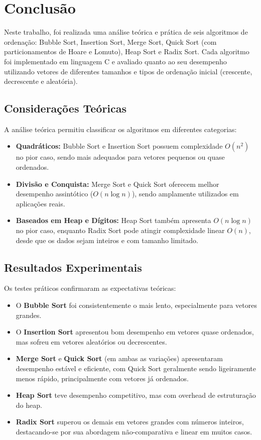 \section{Conclusão}

Neste trabalho, foi realizada uma análise teórica e prática de seis algoritmos de ordenação: Bubble Sort, Insertion Sort, Merge Sort, Quick Sort (com particionamentos de Hoare e Lomuto), Heap Sort e Radix Sort. Cada algoritmo foi implementado em linguagem C e avaliado quanto ao seu desempenho utilizando vetores de diferentes tamanhos e tipos de ordenação inicial (crescente, decrescente e aleatória).

\subsection*{Considerações Teóricas}

A análise teórica permitiu classificar os algoritmos em diferentes categorias:

\begin{itemize}
    \item \textbf{Quadráticos:} Bubble Sort e Insertion Sort possuem complexidade \(O(n^2)\) no pior caso, sendo mais adequados para vetores pequenos ou quase ordenados.
    \item \textbf{Divisão e Conquista:} Merge Sort e Quick Sort oferecem melhor desempenho assintótico (\(O(n \log n)\)), sendo amplamente utilizados em aplicações reais.
    \item \textbf{Baseados em Heap e Dígitos:} Heap Sort também apresenta \(O(n \log n)\) no pior caso, enquanto Radix Sort pode atingir complexidade linear \(O(n)\), desde que os dados sejam inteiros e com tamanho limitado.
\end{itemize}

\subsection*{Resultados Experimentais}

Os testes práticos confirmaram as expectativas teóricas:

\begin{itemize}
    \item O \textbf{Bubble Sort} foi consistentemente o mais lento, especialmente para vetores grandes.
    \item O \textbf{Insertion Sort} apresentou bom desempenho em vetores quase ordenados, mas sofreu em vetores aleatórios ou decrescentes.
    \item \textbf{Merge Sort} e \textbf{Quick Sort} (em ambas as variações) apresentaram desempenho estável e eficiente, com Quick Sort geralmente sendo ligeiramente menos rápido, principalmente com vetores já ordenados.
    \item \textbf{Heap Sort} teve desempenho competitivo, mas com overhead de estruturação do heap.
    \item \textbf{Radix Sort} superou os demais em vetores grandes com números inteiros, destacando-se por sua abordagem não-comparativa e linear em muitos casos.
\end{itemize}

